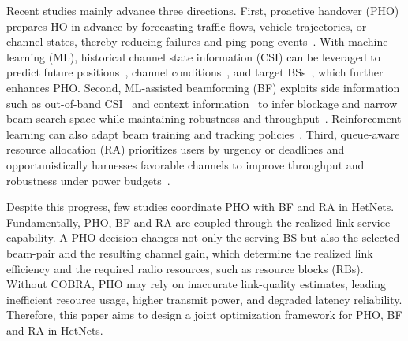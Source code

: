 \documentclass[conference, a4paper]{IEEEtran}
\theoremstyle{remark}
\begin{document}
Recent studies mainly advance three directions. 
First, proactive handover (PHO) prepares HO in advance by forecasting traffic flows, vehicle trajectories, or channel states, thereby reducing failures and ping-pong events~\cite{lee2020prediction,sun2018energy}. With machine learning (ML), historical channel state information (CSI) can be leveraged to predict future positions~\cite{AEPHORA2025ICC}, channel conditions~\cite{ryden2023}, and target BSs~\cite{park2024mobility}, which further enhances PHO.
Second, ML-assisted beamforming (BF) exploits side information such as out-of-band CSI~\cite{alrabeiah2020tcom} and context information~\cite{va2017inverse} to infer blockage and narrow beam search space while maintaining robustness and throughput~\cite{wang2024beam}. Reinforcement learning can also adapt beam training and tracking policies~\cite{xie2024TVT}.
Third, queue-aware resource allocation (RA) prioritizes users by urgency or deadlines and opportunistically harnesses favorable channels to improve throughput and robustness under power budgets~\cite{liu2022queueaware,zhang2019qosaware}. 

Despite this progress, few studies coordinate PHO with BF and RA in HetNets.
Fundamentally, PHO, BF and RA are coupled through the realized link service capability. A PHO decision changes not only the serving BS but also the selected beam-pair and the resulting channel gain, which determine the realized link efficiency and the required radio resources, such as resource blocks (RBs).
Without COBRA, PHO may rely on inaccurate link-quality estimates, leading inefficient resource usage, higher transmit power, and degraded latency reliability. Therefore, this paper aims to design a joint optimization framework for PHO, BF and RA in HetNets.





\end{document}
